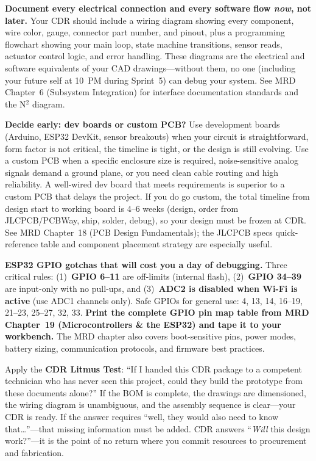 \begin{tipbox}
\textbf{Document every electrical connection and every software flow \textit{now}, not later.} Your CDR should include a wiring diagram showing every component, wire color, gauge, connector part number, and pinout, plus a programming flowchart showing your main loop, state machine transitions, sensor reads, actuator control logic, and error handling. These diagrams are the electrical and software equivalents of your CAD drawings---without them, no one (including your future self at 10~PM during Sprint~5) can debug your system. See MRD Chapter~6 (Subsystem Integration) for interface documentation standards and the N$^2$ diagram.
\end{tipbox}

\begin{protip}
\textbf{Decide early: dev boards or custom PCB?} Use development boards (Arduino, ESP32 DevKit, sensor breakouts) when your circuit is straightforward, form factor is not critical, the timeline is tight, or the design is still evolving. Use a custom PCB when a specific enclosure size is required, noise-sensitive analog signals demand a ground plane, or you need clean cable routing and high reliability. A well-wired dev board that meets requirements is superior to a custom PCB that delays the project. If you do go custom, the total timeline from design start to working board is 4--6 weeks (design, order from JLCPCB/PCBWay, ship, solder, debug), so your design must be frozen at CDR. See MRD Chapter~18 (PCB Design Fundamentals); the JLCPCB specs quick-reference table and component placement strategy are especially useful.
\end{protip}

\begin{warnbox}
\textbf{ESP32 GPIO gotchas that will cost you a day of debugging.} Three critical rules: (1)~\textbf{GPIO 6--11} are off-limits (internal flash), (2)~\textbf{GPIO 34--39} are input-only with no pull-ups, and (3)~\textbf{ADC2 is disabled when Wi-Fi is active} (use ADC1 channels only). Safe GPIOs for general use: 4, 13, 14, 16--19, 21--23, 25--27, 32, 33. \textbf{Print the complete GPIO pin map table from MRD Chapter~19 (Microcontrollers \& the ESP32) and tape it to your workbench.} The MRD chapter also covers boot-sensitive pins, power modes, battery sizing, communication protocols, and firmware best practices.
\end{warnbox}

\begin{faqbox}
Apply the \textbf{CDR Litmus Test}: ``If I handed this CDR package to a competent technician who has never seen this project, could they build the prototype from these documents alone?'' If the BOM is complete, the drawings are dimensioned, the wiring diagram is unambiguous, and the assembly sequence is clear---your CDR is ready. If the answer requires ``well, they would also need to know that\ldots''---that missing information must be added. CDR answers ``\textit{Will} this design work?''---it is the point of no return where you commit resources to procurement and fabrication.
\end{faqbox}

